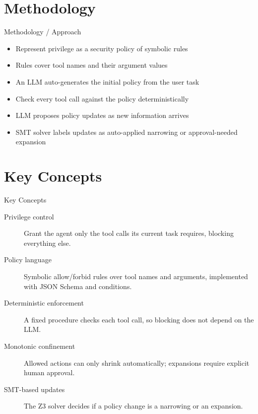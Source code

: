 \documentclass[10pt]{beamer}
\begin{document}
\section{Methodology}
\begin{frame}[allowframebreaks]{Methodology / Approach}
\begin{itemize}
  \item Represent privilege as a security policy of symbolic rules
  \item Rules cover tool names and their argument values
  \item An LLM auto-generates the initial policy from the user task
  \item Check every tool call against the policy deterministically
  \item LLM proposes policy updates as new information arrives
  \item SMT solver labels updates as auto-applied narrowing or approval-needed expansion
\end{itemize}
\end{frame}

\section{Key Concepts}
\begin{frame}[allowframebreaks]{Key Concepts}
  \begin{description}
    \item[Privilege control] Grant the agent only the tool calls its current task requires, blocking everything else.
    \item[Policy language] Symbolic allow/forbid rules over tool names and arguments, implemented with JSON Schema and conditions.
    \item[Deterministic enforcement] A fixed procedure checks each tool call, so blocking does not depend on the LLM.
    \item[Monotonic confinement] Allowed actions can only shrink automatically; expansions require explicit human approval.
    \item[SMT-based updates] The Z3 solver decides if a policy change is a narrowing or an expansion.
  \end{description}
\end{frame}
\end{document}
